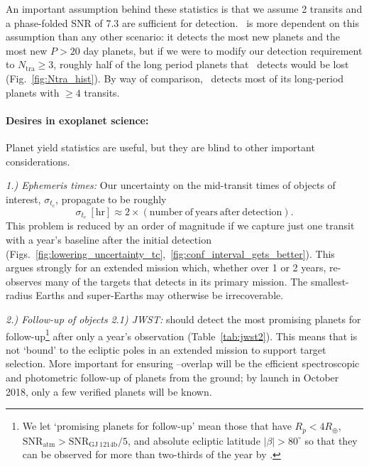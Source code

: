 An important assumption behind these statistics is that we assume 2 transits and a phase-folded SNR of 7.3 are sufficient for detection.
\hemis\ is more dependent on this assumption than any other scenario: it detects the most new planets and the most new $P>20$ day planets, but if we were to modify our detection requirement to $N_\mathrm{tra}\geq 3$, roughly half of the long period planets that \hemis\ detects would be lost (Fig.~\ref{fig:Ntra_hist}).
By way of comparison, \npole\ detects most of its long-period planets with $\ge 4$ transits.





\paragraph{Desires in exoplanet science:}
Planet yield statistics are useful, but they are blind to other important considerations.

\textit{1.) Ephemeris times:} 
Our uncertainty on the mid-transit times of \tess objects of interest, $\sigma_{t_c}$, propagate to be roughly
$$\sigma_{t_c}\ \mathrm{[hr]} \approx 2\times\left(\mathrm{number\ of\ years\ after\ detection}\right). $$
This problem is reduced by an order of magnitude if we capture just one transit with a year's baseline after the initial detection (Figs.~\ref{fig:lowering_uncertainty_tc},~\ref{fig:conf_interval_gets_better}).
This argues strongly for an extended mission which, whether over 1 or 2 years, re-observes many of the targets that \tess detects in its primary mission. 
The smallest-radius Earths and super-Earths may otherwise be irrecoverable.

\textit{2.) Follow-up of \tess objects}\newline
\textit{2.1) JWST:} \tess should detect the most promising planets for \jwst follow-up\footnote{We let `promising planets for \jwst follow-up' mean those that have $R_p<4R_\oplus$, $\mathrm{SNR_{atm}} > \mathrm{SNR_{GJ\ 1214b}}/5$, and absolute ecliptic latitude $|\beta|>80^\circ$ so that they can be observed for more than two-thirds of the year by \jwst\!.} after only a year's observation (Table~\ref{tab:jwst2}).
This means that \tess is not `bound' to the ecliptic poles in an extended mission to support \jwsts target selection.
More important for ensuring \jwst\!--\tess overlap will be the efficient spectroscopic and photometric follow-up of \tesss planets from the ground; by \jwsts launch in October 2018, only a few verified \tess planets will be known.

